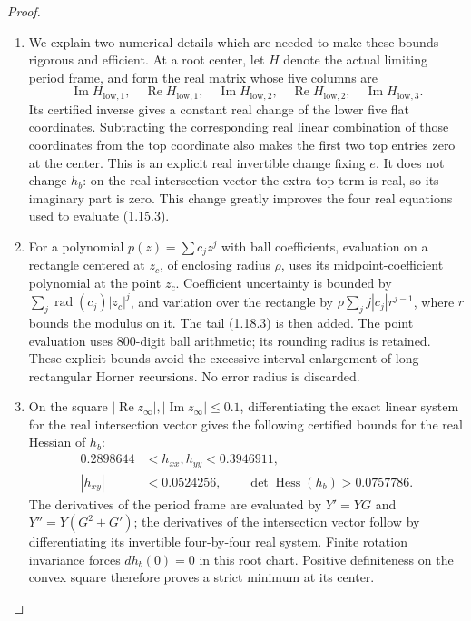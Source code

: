 \documentclass[11pt,a4paper]{article}
\theoremstyle{definition}
\begin{document}
\begin{proof}
\begin{enumerate}[label=\arabic*.]
\item We explain two numerical details which are needed to make these
bounds rigorous and efficient.  At a root center, let $H$ denote
the actual limiting period frame, and form the real matrix whose
five columns are
\[
 \operatorname{Im}H_{\mathrm{low},1},\quad
 \operatorname{Re}H_{\mathrm{low},1},\quad
 \operatorname{Im}H_{\mathrm{low},2},\quad
 \operatorname{Re}H_{\mathrm{low},2},\quad
 \operatorname{Im}H_{\mathrm{low},3}.
\]
Its certified inverse gives a constant real change of the lower five
flat coordinates.  Subtracting the corresponding real linear
combination of those coordinates from the top coordinate also
makes the first two top entries zero at the center.  This is an
explicit real invertible change fixing $e$.  It does not change
$h_b$: on the real intersection vector the extra top term is real,
so its imaginary part is zero.  This change greatly improves the
four real equations used to evaluate (1.15.3).

\item For a polynomial $p(z)=\sum c_jz^j$ with ball coefficients, evaluation
on a rectangle centered at $z_c$, of enclosing radius $\rho$, uses
its midpoint-coefficient polynomial at the point $z_c$.  Coefficient
uncertainty is bounded by
$\sum_j\operatorname{rad}(c_j)|z_c|^j$, and variation over the
rectangle by
$\rho\sum_j j|c_j|r^{j-1}$, where $r$ bounds the modulus on it.
The tail (1.18.3) is then added.  The point evaluation uses 800-digit
ball arithmetic; its rounding radius is retained.  These explicit
bounds avoid the excessive interval enlargement of long rectangular
Horner recursions.  No error radius is discarded.

\item On the square $|\operatorname{Re}z_\infty|,
|\operatorname{Im}z_\infty|\leq0.1$, differentiating the exact linear
system for the real intersection vector gives the following
certified bounds for the real Hessian of $h_b$:
\[
\begin{split}
 0.2898644&<h_{xx},h_{yy}<0.3946911,\\
 |h_{xy}|&<0.0524256,\qquad
 \det\operatorname{Hess}(h_b)>0.0757786.
\end{split}
\tag{1.18.5}
\]
The derivatives of the period frame are evaluated by
$Y'=YG$ and $Y''=Y(G^2+G')$; the derivatives of the intersection
vector follow by differentiating its invertible four-by-four real
system.  Finite rotation invariance forces $dh_b(0)=0$ in this
root chart.  Positive definiteness on the convex square therefore
proves a strict minimum at its center.


\end{enumerate}
\end{proof}
\end{document}
